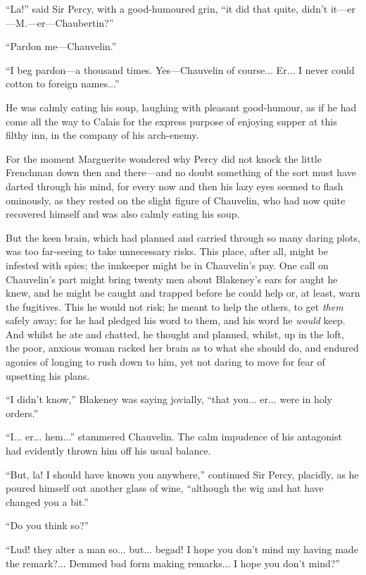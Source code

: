 \documentclass[paper=a5,BCOR=7mm,twoside,DIV=calc,12pt,usegeometry,chapterprefix,endperiod,headings=big]{scrbook}
\begin{document}
\enquote{La!} said Sir Percy, with a good-humoured grin, \enquote{it did that quite, didn't it---er---M.---er---Chaubertin?}

\enquote{Pardon me---Chauvelin.}

\enquote{I beg pardon---a thousand times. Yes---Chauvelin of course... Er... I never could cotton to foreign names...}

He was calmly eating his soup, laughing with pleasant good-humour, as if he had come all the way to Calais for the express purpose of enjoying supper at this filthy inn, in the company of his arch-enemy.

For the moment Marguerite wondered why Percy did not knock the little Frenchman down then and there---and no doubt something of the sort must have darted through his mind, for every now and then his lazy eyes seemed to flash ominously, as they rested on the slight figure of Chauvelin, who had now quite recovered himself and was also calmly eating his soup.

But the keen brain, which had planned and carried through so many daring plots, was too far-seeing to take unnecessary risks. This place, after all, might be infested with spies; the innkeeper might be in Chauvelin's pay. One call on Chauvelin's part might bring twenty men about Blakeney's ears for aught he knew, and he might be caught and trapped before he could help or, at least, warn the fugitives. This he would not risk; he meant to help the others, to get \textit{them} safely away; for he had pledged his word to them, and his word he \textit{would} keep. And whilst he ate and chatted, he thought and planned, whilst, up in the loft, the poor, anxious woman racked her brain as to what she should do, and endured agonies of longing to rush down to him, yet not daring to move for fear of upsetting his plans.

\enquote{I didn't know,} Blakeney was saying jovially, \enquote{that you... er... were in holy orders.}

\enquote{I... er... hem...} stammered Chauvelin. The calm impudence of his antagonist had evidently thrown him off his usual balance.

\enquote{But, la! I should have known you anywhere,} continued Sir Percy, placidly, as he poured himself out another glass of wine, \enquote{although the wig and hat have changed you a bit.}

\enquote{Do you think so?}

\enquote{Lud! they alter a man so... but... begad! I hope you don't mind my having made the remark?... Demmed bad form making remarks... I hope you don't mind?}
\end{document}
